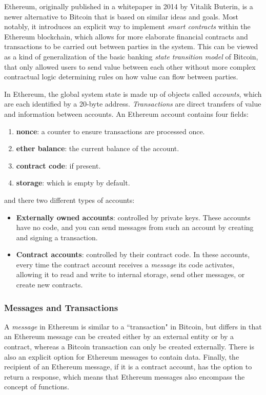 \documentclass[10pt,a4paper]{article}
\begin{document}
Ethereum, originally published in a whitepaper \cite{Buterin2013} in 2014 by Vitalik Buterin, is a newer alternative to Bitcoin that is based on similar ideas and goals. Most notably, it introduces an explicit way to implement \textit{smart contracts} within the Ethereum blockchain, which allows for more elaborate financial contracts and transactions to be carried out between parties in the system. This can be viewed as a kind of generalization of the basic banking \textit{state transition model} of Bitcoin, that only allowed users to  send value between each other without more complex contractual logic determining rules on how value can flow between parties.

In Ethereum, the global system state is made up of objects called \textit{accounts}, which are each identified by a 20-byte address. \textit{Transactions} are direct transfers of value and information between accounts. An Ethereum account contains four fields: 
\begin{enumerate}[1.]
    \item \textbf{nonce}: a counter to ensure transactions are processed once.
    \item \textbf{ether balance}: the current balance of the account.
    \item \textbf{contract code}: if present.
    \item \textbf{storage}: which is empty by default.
\end{enumerate}
and there two different types of accounts:
\begin{itemize}
    \item \textbf{Externally owned accounts}: controlled by private keys. These accounts have no code, and you can send messages from such an account by creating and signing a transaction.
    \item \textbf{Contract accounts}: controlled by their contract code. In these accounts, every time the contract account receives a \textit{message} its code activates, allowing it to read and write to internal storage, send other messages, or create new contracts.
\end{itemize}

\subsubsection{Messages and Transactions}

A \textit{message} in Ethereum is similar to a ``transaction" in Bitcoin, but differs in that an Ethereum message can be created either by an external entity or by a contract, whereas a Bitcoin transaction can only be created externally. There is also an explicit option for Ethereum messages to contain data. Finally, the recipient of an Ethereum message, if it is a contract account, has the option to return a response, which means that Ethereum messages also encompass the concept of functions.
\end{document}
